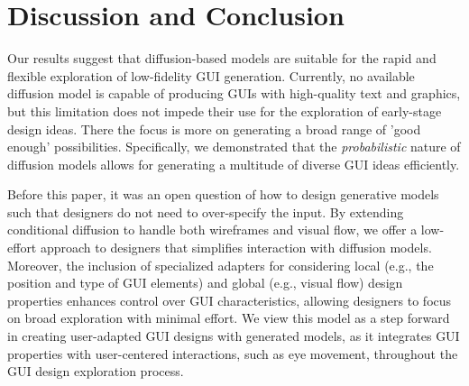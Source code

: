 \section{Discussion and Conclusion} 



Our results suggest that diffusion-based models are suitable for the rapid and flexible exploration of low-fidelity GUI generation.
Currently, no available diffusion model is capable of producing GUIs with high-quality text and graphics, but this limitation does not impede their use for the exploration of early-stage design ideas.
There the focus is more on generating a broad range of 'good enough' possibilities.
Specifically, we demonstrated that the \emph{probabilistic} nature of diffusion models allows for generating a multitude of diverse GUI ideas efficiently. 

Before this paper, it was an open question of how to design generative models such that designers do not need to over-specify the input.
By extending conditional diffusion to handle both wireframes and visual flow, we offer a low-effort approach to designers that simplifies interaction with diffusion models. 
%
Moreover, the inclusion of specialized adapters for considering local (e.g., the position and type of GUI elements) and global (e.g., visual flow) design properties enhances control over GUI characteristics, allowing designers to focus on broad exploration with minimal effort. 
We view this model as a step forward in creating user-adapted GUI designs with generated models, as it integrates GUI properties with user-centered interactions, such as eye movement, throughout the GUI design exploration process.








